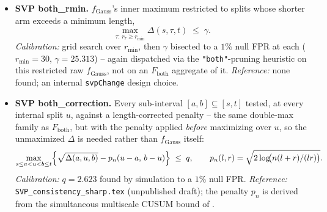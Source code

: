\documentclass[11pt]{article}
\begin{document}
\begin{itemize}
\item \textbf{SVP both\_rmin.} $f_{\mathrm{Gauss}}$'s inner maximum
restricted to splits whose shorter arm exceeds a minimum length,
\[
\max_{\tau:\,r_\tau\ge r_{\min}} \Delta(s,\tau,t) \;\le\; \gamma.
\]
\emph{Calibration:} grid search over $r_{\min}$, then $\gamma$ bisected to
a $1\%$ null FPR at each ($r_{\min}=30$, $\gamma=25.313$) -- again
dispatched via the \texttt{"both"}-pruning heuristic on this restricted
raw $f_{\mathrm{Gauss}}$, not on an $F_{\mathrm{both}}$ aggregate of it.
\emph{Reference:} none found; an internal \texttt{svpChange}
design choice.

\item \textbf{SVP both\_correction.} Every sub-interval $[a,b]\subseteq[s,t]$
tested, at every internal split $u$, against a length-corrected penalty --
the same double-max family as $F_{\mathrm{both}}$, but with the penalty
applied \emph{before} maximizing over $u$, so the unmaximized $\Delta$ is
needed rather than $f_{\mathrm{Gauss}}$ itself:
\[
\max_{s\le a<u<b\le t}\Bigl\{\sqrt{\Delta(a,u,b)} - p_n(u-a,\,b-u)\Bigr\} \;\le\; q,
\qquad p_n(l,r)=\sqrt{2\log\!\bigl(n(l+r)/(lr)\bigr)}.
\]
\emph{Calibration:} $q=2.623$ found by simulation to a $1\%$ null FPR.
\emph{Reference:} \texttt{SVP\_consistency\_sharp.tex} (unpublished draft);
the penalty $p_n$ is derived from the simultaneous multiscale CUSUM bound
of \cite{verzelen2020}.


\end{itemize}
\end{document}
